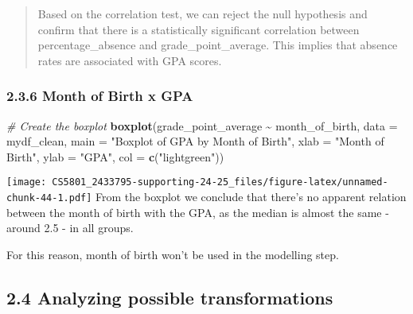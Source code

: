 \documentclass[
]{article}
\newenvironment{Shaded}{\begin{snugshade}}{\end{snugshade}}
\newcommand{\AttributeTok}[1]{\textcolor[rgb]{0.13,0.29,0.53}{#1}}
\newcommand{\CommentTok}[1]{\textcolor[rgb]{0.56,0.35,0.01}{\textit{#1}}}
\newcommand{\DecValTok}[1]{\textcolor[rgb]{0.00,0.00,0.81}{#1}}
\newcommand{\FunctionTok}[1]{\textcolor[rgb]{0.13,0.29,0.53}{\textbf{#1}}}
\newcommand{\NormalTok}[1]{#1}
\newcommand{\SpecialCharTok}[1]{\textcolor[rgb]{0.81,0.36,0.00}{\textbf{#1}}}
\newcommand{\StringTok}[1]{\textcolor[rgb]{0.31,0.60,0.02}{#1}}
\begin{document}
\begin{quote}
Based on the correlation test, we can reject the null hypothesis and
confirm that there is a statistically significant correlation between
percentage\_absence and grade\_point\_average. This implies that absence
rates are associated with GPA scores.
\end{quote}

\subsubsection{2.3.6 Month of Birth x GPA}\label{month-of-birth-x-gpa}

\begin{Shaded}
\begin{Highlighting}[]
\CommentTok{\# Create the boxplot}
\FunctionTok{boxplot}\NormalTok{(grade\_point\_average }\SpecialCharTok{\textasciitilde{}}\NormalTok{ month\_of\_birth, }
        \AttributeTok{data =}\NormalTok{ mydf\_clean, }
        \AttributeTok{main =} \StringTok{"Boxplot of GPA by Month of Birth"}\NormalTok{,}
        \AttributeTok{xlab =} \StringTok{"Month of Birth"}\NormalTok{,}
        \AttributeTok{ylab =} \StringTok{"GPA"}\NormalTok{,}
        \AttributeTok{col =} \FunctionTok{c}\NormalTok{(}\StringTok{"lightgreen"}\NormalTok{))}
\end{Highlighting}
\end{Shaded}

\texttt{[image: CS5801\_2433795-supporting-24-25\_files/figure-latex/unnamed-chunk-44-1.pdf]}
From the boxplot we conclude that there's no apparent relation between
the month of birth with the GPA, as the median is almost the same -
around 2.5 - in all groups.

For this reason, month of birth won't be used in the modelling step.

\subsection{2.4 Analyzing possible
transformations}\label{analyzing-possible-transformations}

\begin{Shaded}
\end{Shaded}
\end{document}
